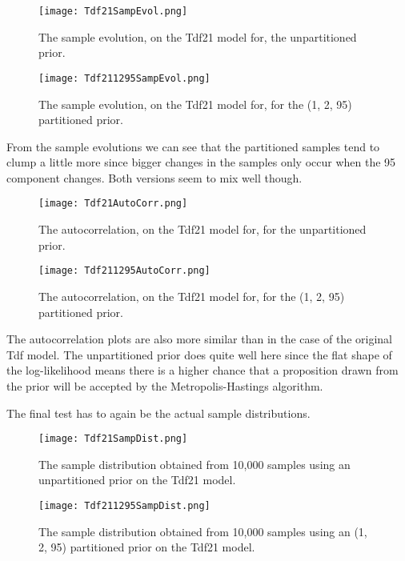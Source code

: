 \begin{figure}[H]
    \centering
    \texttt{[image: Tdf21SampEvol.png]}
    \caption{The sample evolution, on the Tdf21 model for, the unpartitioned prior.}
    \label{fig:21UnpSampEvol}
\end{figure}

\begin{figure}[H]
    \centering
    \texttt{[image: Tdf211295SampEvol.png]}
    \caption{The sample evolution, on the Tdf21 model for, for the (1, 2, 95) partitioned prior.}
    \label{fig:211295SampEvol}
\end{figure}

From the sample evolutions we can see that the partitioned samples tend to clump a little more since bigger changes in the samples only occur when the 95 component changes. Both versions seem to mix well though.

\begin{figure}[H]
    \centering
    \texttt{[image: Tdf21AutoCorr.png]}
    \caption{The autocorrelation, on the Tdf21 model for, for the unpartitioned prior.}
    \label{fig:21UnpAutoCorr}
\end{figure}

\begin{figure}[H]
    \centering
    \texttt{[image: Tdf211295AutoCorr.png]}
    \caption{The autocorrelation, on the Tdf21 model for, for the (1, 2, 95) partitioned prior.}
    \label{fig:211295AutoCorr}
\end{figure}

The autocorrelation plots are also more similar than in the case of the original Tdf model. The unpartitioned prior does quite well here since the flat shape of the log-likelihood means there is a higher chance that a proposition drawn from the prior will be accepted by the Metropolis-Hastings algorithm.

The final test has to again be the actual sample distributions.

\begin{figure}[H]
    \centering
    \texttt{[image: Tdf21SampDist.png]}
    \caption{The sample distribution obtained from 10,000 samples using an unpartitioned prior on the Tdf21 model.}
    \label{fig:21UnpSampDist}
\end{figure}

\begin{figure}[H]
    \centering
    \texttt{[image: Tdf211295SampDist.png]}
    \caption{The sample distribution obtained from 10,000 samples using an (1, 2, 95) partitioned prior on the Tdf21 model.}
    \label{fig:211295SampDist}
\end{figure}

